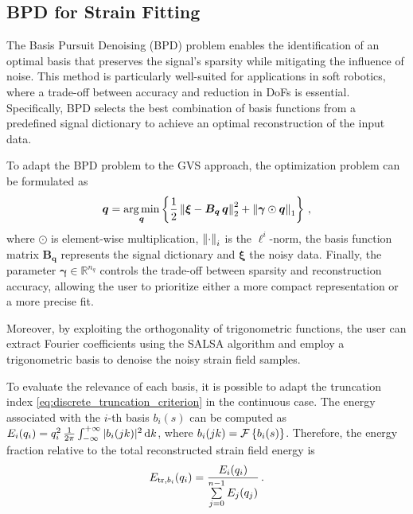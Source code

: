 \subsection{\ac{BPD} for Strain Fitting} \label{spectrum_extraction:bpd}
The Basis Pursuit Denoising (BPD) problem enables the identification of an optimal basis that preserves the signal's sparsity while mitigating the influence of noise. 
This method is particularly well-suited for applications in soft robotics, where a trade-off between accuracy and reduction in \ac{DoFs} is essential. Specifically, \ac{BPD} selects the best combination of basis functions from a predefined signal dictionary to achieve an optimal reconstruction of the input data.

To adapt the \ac{BPD} problem to the \ac{GVS} approach, the optimization problem can be formulated as
\begin{equation} \label{eq:bpdn_opt_problem}
    \bm{q} = \underset{\bm{q}}{\arg \min} \left\{\frac{1}{2}\left\lVert\bm{\xi} - \bm{B}_{\bm{q}} \, \bm{q}\right\rVert^{2}_{2} + \left\lVert\bm{\gamma} \odot \bm{q}\right\rVert_1\right\} \, ,
\end{equation}
where $\odot$ is element-wise multiplication, $\left\lVert\cdot\right\rVert_i$ is the $\mathcal{\ell}^i$-norm, the basis function matrix $\bm{B}_{\bm{q}}$ represents the signal dictionary and $\bm{\xi}$ the noisy data. Finally, the parameter $\bm{\gamma} \in \mathbb{R}^{n_q}$ controls the trade-off between sparsity and reconstruction accuracy, allowing the user to prioritize either a more compact representation or a more precise fit.

Moreover, by exploiting the orthogonality of trigonometric functions, the user can extract Fourier coefficients using the \ac{SALSA} algorithm \cite{afonso2010fast} and employ a trigonometric basis to denoise the noisy strain field samples.

To evaluate the relevance of each basis, it is possible to adapt the truncation index \eqref{eq:discrete_truncation_criterion} in the continuous case.
The energy associated with the $i$-th basis $b_i(s)$ can be computed as $E_i(q_i) = q_i^2 \, \frac{1}{2 \pi}\int_{-\infty}^{+\infty} |b_i(jk)|^{2} \, \textnormal{d}k$, where $b_i(jk) = \mathcal{F}\left\{b_i(s)\right\}$.
Therefore, the energy fraction relative to the total reconstructed strain field energy is
\begin{equation}
    E_{\textnormal{tr}, b_i}(q_i) = \frac{E_i(q_i)}{\sum\limits_{j = 0}^{n - 1} E_j(q_j)} \, .
\end{equation}

